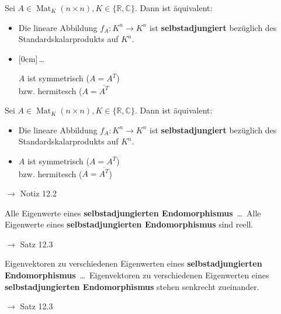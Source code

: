 \documentclass[11pt]{article}
\renewcommand{\cite}[1]{\par\bigskip\hfill{\color{gray}\tiny\(\to\) #1}}
\newcommand{\CC}{\mathbb{C}}
\newcommand{\RR}{\mathbb{R}}
\DeclareMathOperator{\Mat}{Mat}
\newcommand{\hide}[1]{\parbox{0cm}{\raisebox{-7pt}[0cm]{\dots}}\color{white}#1\color{black}}
\let\olddots\dots
\renewcommand{\dots}{\,\olddots\,}
\newenvironment{field}{}{\newpage}
\newif\ifnote
\newenvironment{note}{\notetrue}{\notefalse}
\newcommand{\localtag}{}
\newcommand{\globaltag}{}
\newcommand{\uuid}{}
\newcommand{\tags}[1]{
    \ifnote
        \renewcommand{\localtag}{#1}
    \else
        \renewcommand{\globaltag}{#1}
    \fi
    }
\newcommand{\xplain}[1]{\renewcommand{\uuid}{#1}}
\begin{document}
\begin{note}
    \begin{field}
        Sei $A\in \Mat_K(n\times n), K\in\{\RR,\CC\}$. Dann ist äquivalent:
        \begin{itemize}
            \item Die lineare Abbildung $f_A: K^n\longrightarrow K^n$ ist \textbf{selbstadjungiert} bezüglich des Standardskalarprodukts auf $K^n$.
            \item \hide{$A$ ist symmetrisch ($A = A^T$) \\ bzw. hermitesch ($A = \overline{A^T}$}
        \end{itemize}
    \end{field}
    \begin{field}
        Sei $A\in \Mat_K(n\times n), K\in\{\RR,\CC\}$. Dann ist äquivalent:
        \begin{itemize}
            \item Die lineare Abbildung $f_A: K^n\longrightarrow K^n$ ist \textbf{selbstadjungiert} bezüglich des Standardskalarprodukts auf $K^n$.
            \item $A$ ist symmetrisch ($A = A^T$) \\ bzw. hermitesch ($A = \overline{A^T}$)
        \end{itemize}
        \cite{Notiz 12.2}
    \end{field}
\end{note}

\begin{note}
    \tags{Satz}
    \xplain{eaa8db5e-c790-11ec-9d64-0242ac120002}
    \begin{field}
        Alle Eigenwerte eines \textbf{selbstadjungierten Endomorphismus} \dots
    \end{field}
    \begin{field}
        Alle Eigenwerte eines \textbf{selbstadjungierten Endomorphismus} sind reell.
        \cite{Satz 12.3}
    \end{field}

    \begin{field}
        Eigenvektoren zu verschiedenen Eigenwerten eines \textbf{selbstadjungierten Endomorphismus} \dots
    \end{field}
    \begin{field}
        Eigenvektoren zu verschiedenen Eigenwerten eines \textbf{selbstadjungierten Endomorphismus} stehen senkrecht zueinander.
        \cite{Satz 12.3}
    \end{field}
\end{note}
\end{document}
